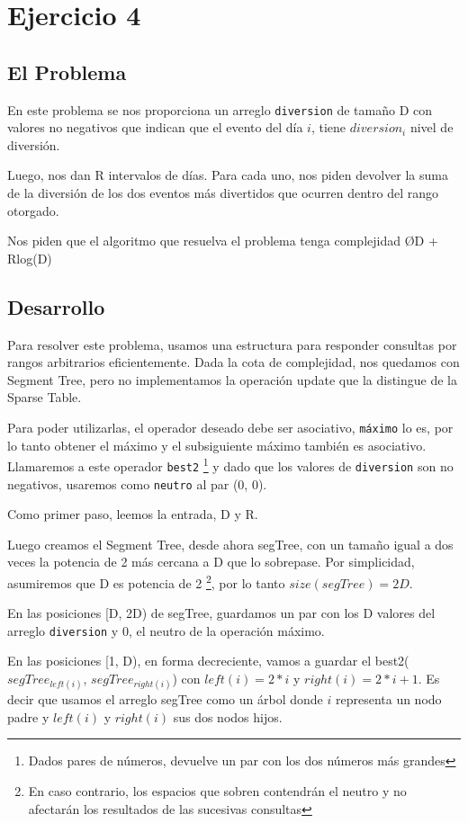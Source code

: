 \section{Ejercicio 4}
\subsection{El Problema}
En este problema se nos proporciona un arreglo \texttt{diversion} de tama\~no D con valores no negativos que indican que el evento del d\'ia $i$, tiene $diversion_i$ nivel de diversi\'on.

Luego, nos dan R intervalos de d\'ias. Para cada uno, nos piden devolver la suma de la diversi\'on de los dos eventos m\'as divertidos que ocurren dentro del rango otorgado.

Nos piden que el algoritmo que resuelva el problema tenga complejidad \O{D + 	Rlog(D)}

\subsection{Desarrollo}
Para resolver este problema, usamos una estructura para responder consultas por rangos arbitrarios eficientemente. Dada la cota de complejidad, nos quedamos con Segment Tree, pero no implementamos la operaci\'on update que la distingue de la Sparse Table.

Para poder utilizarlas, el operador deseado debe ser asociativo, \texttt{m\'aximo} lo es, por lo tanto obtener el m\'aximo y el subsiguiente m\'aximo tambi\'en es asociativo. Llamaremos a este operador \texttt{best2} \footnote{Dados pares de n\'umeros, devuelve un par con los dos n\'umeros m\'as grandes} y dado que los valores de \texttt{diversion} son no negativos, usaremos como \texttt{neutro} al par (0, 0).

Como primer paso, leemos la entrada, D y R.

Luego creamos el Segment Tree, desde ahora segTree, con un tama\~no igual a dos veces la potencia de 2 m\'as cercana a D que lo sobrepase. Por simplicidad, asumiremos que D es potencia de 2 \footnote{En caso contrario, los espacios que sobren contendr\'an el neutro y no afectar\'an los resultados de las sucesivas consultas}, por lo tanto $size(segTree) = 2D$.

En las posiciones [D, 2D) de segTree, guardamos un par con los D valores del arreglo \texttt{diversion} y 0, el neutro de la operaci\'on m\'aximo.

En las posiciones [1, D), en forma decreciente, vamos a guardar el best2($segTree_{left(i)}$, $segTree_{right(i)}$) con $left(i) = 2 * i$ y $right(i) = 2 * i + 1$. Es decir que usamos el arreglo segTree como un \'arbol donde $i$ representa un nodo padre y $left(i)$ y $right(i)$ sus dos nodos hijos.

